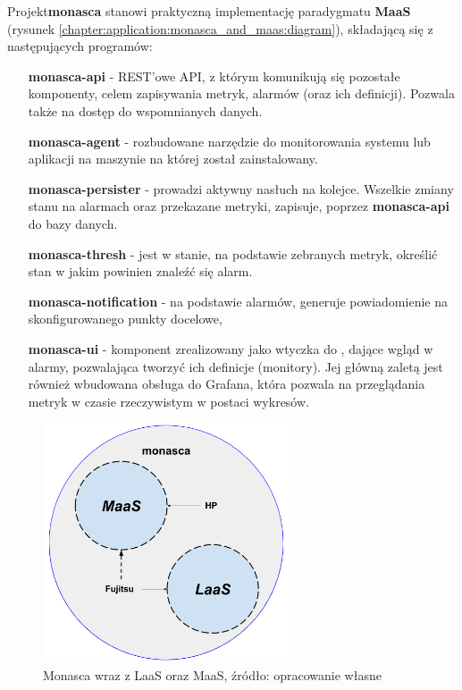 Projekt\textbf{monasca} stanowi praktyczną implementację paradygmatu \textbf{MaaS} 
(rysunek \ref{chapter:application:monasca_and_maas:diagram}), składającą się z następujących
programów:
\begin{itemize}
    \item[\textbf{monasca-api}] - REST'owe API, z którym komunikują się pozostałe komponenty, celem zapisywania metryk, alarmów (oraz ich definicji).
    Pozwala także na dostęp do wspomnianych danych.
    \item[\textbf{monasca-agent}] - rozbudowane narzędzie do monitorowania systemu lub aplikacji na maszynie na której został zainstalowany.
    \item[\textbf{monasca-persister}] - prowadzi aktywny nasłuch na kolejce. Wszelkie zmiany stanu na alarmach oraz przekazane metryki, zapisuje,
    poprzez \textbf{monasca-api} do bazy danych.
    \item[\textbf{monasca-thresh}] - jest w stanie, na podstawie zebranych metryk, określić stan w jakim powinien znaleźć się alarm.
    \item[\textbf{monasca-notification}] - na podstawie alarmów, generuje powiadomienie na skonfigurowanego punkty docelowe,
    \item[\textbf{monasca-ui}] - komponent zrealizowany jako wtyczka do , dające wgląd w alarmy, pozwalająca tworzyć ich definicje (monitory).
    Jej główną zaletą jest również wbudowana obsługa do Grafana, która pozwala na przeglądania metryk w czasie rzeczywistym w postaci wykresów.
\end{itemize}

\begin{figure}[H]
    \centering
    \includegraphics[width=0.65\textwidth]{images/monasca_with_laas}
    \caption[Monasca wraz z LaaS oraz MaaS]{
        Monasca wraz z LaaS oraz MaaS, źródło: opracowanie własne
    }
    \label{chapter:application:monasca_with_laas:diagram}
\end{figure}

